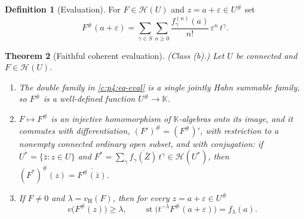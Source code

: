 \documentclass[11pt,a4paper]{article}
\numberwithin{equation}{section}
\newtheorem{theorem}{Theorem}[section]
\theoremstyle{definition}
\newtheorem{definition}[theorem]{Definition}
\theoremstyle{remark}
\theoremstyle{plain}
\newcommand{\K}{\mathbb K}
\DeclareMathOperator{\st}{st}
\newcommand{\tm}{t}
\newcommand{\halo}[1]{#1^{\#}}
\newcommand{\ev}[1]{#1^{\#}}
\newcommand{\Hc}{\mathcal H}
\newcommand{\vH}{v_{\mathrm H}}
\begin{document}
\begin{definition}[Evaluation]\label{c:p4:def-eval}
For $F\in\Hc(U)$ and $z=a+\varepsilon\in\halo U$ set
\begin{equation}\label{c:p4:eq-eval}
 \ev F(a+\varepsilon)
 =\sum_{\gamma\in S}\sum_{n\ge0}
   \frac{f_\gamma^{(n)}(a)}{n!}\,\varepsilon^n\,\tm^\gamma .
\end{equation}
\end{definition}

\begin{theorem}[Faithful coherent evaluation]\label{c:p4:eval}
\emph{(Class (b).)} Let $U$ be connected and $F\in\Hc(U)$.
\begin{enumerate}[label=(\roman*)]
\item The double family in \eqref{c:p4:eq-eval} is a single jointly
Hahn summable family, so $\ev F$ is a well-defined function
$\halo U\to\K$.
\item $F\mapsto\ev F$ is an injective homomorphism of $\K$-algebras onto
its image, and it commutes with differentiation,
$\ev{(F')}=(\ev F)'$, with restriction to a nonempty connected ordinary
open subset, and with conjugation: if
$U^{*}=\{\bar z:z\in U\}$ and
$F^{*}=\sum_\gamma\overline{f_\gamma(\bar Z)}\,\tm^\gamma\in\Hc(U^{*})$,
then $\ev{(F^{*})}(z)=\overline{\ev F(\bar z)}$.
\item If $F\ne0$ and $\lambda=\vH(F)$, then for every $z=a+\varepsilon
\in\halo U$
\begin{equation}\label{c:p4:eq-reduction}
 v\bigl(\ev F(z)\bigr)\ge\lambda,
 \qquad
 \st\bigl(\tm^{-\lambda}\ev F(a+\varepsilon)\bigr)=f_\lambda(a).
\end{equation}
\end{enumerate}
\end{theorem}
\end{document}
